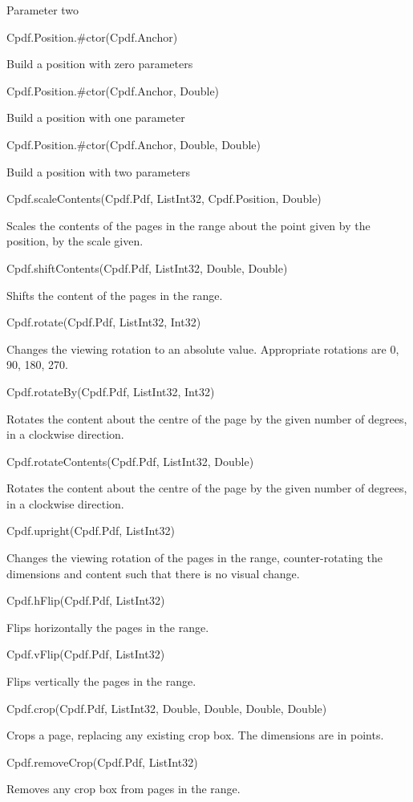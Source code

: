 Parameter two

Cpdf.Position.#ctor(Cpdf.Anchor)

Build a position with zero parameters

Cpdf.Position.#ctor(Cpdf.Anchor, Double)

Build a position with one parameter

Cpdf.Position.#ctor(Cpdf.Anchor, Double, Double)

Build a position with two parameters

Cpdf.scaleContents(Cpdf.Pdf, List{Int32}, Cpdf.Position, Double)

Scales the contents of the pages in the range about the point given by the
position, by the scale given.

Cpdf.shiftContents(Cpdf.Pdf, List{Int32}, Double, Double)

Shifts the content of the pages in the range.

Cpdf.rotate(Cpdf.Pdf, List{Int32}, Int32)

Changes the viewing rotation to an absolute value. Appropriate rotations are 0,
90, 180, 270.

Cpdf.rotateBy(Cpdf.Pdf, List{Int32}, Int32)

Rotates the content about the centre of the page by the given number of
degrees, in a clockwise direction.

Cpdf.rotateContents(Cpdf.Pdf, List{Int32}, Double)

Rotates the content about the centre of the page by the given number of
degrees, in a clockwise direction.

Cpdf.upright(Cpdf.Pdf, List{Int32})

Changes the viewing rotation of the pages in the range, counter-rotating the
dimensions and content such that there is no visual change.

Cpdf.hFlip(Cpdf.Pdf, List{Int32})

Flips horizontally the pages in the range.

Cpdf.vFlip(Cpdf.Pdf, List{Int32})

Flips vertically the pages in the range.

Cpdf.crop(Cpdf.Pdf, List{Int32}, Double, Double, Double, Double)

Crops a page, replacing any existing crop box. The dimensions are in points.

Cpdf.removeCrop(Cpdf.Pdf, List{Int32})

Removes any crop box from pages in the range.

